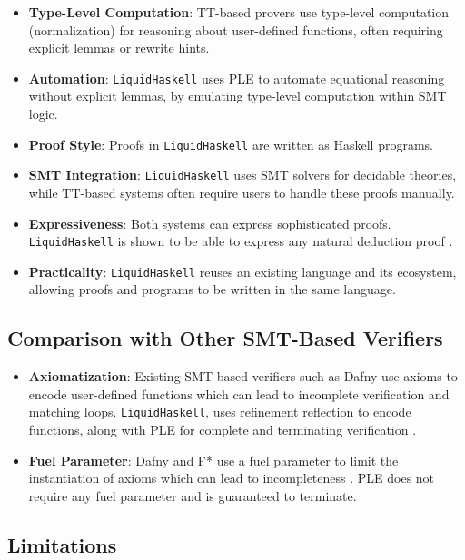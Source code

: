 \documentclass[]{rptuseminar}
\begin{document}
\begin{itemize}
    \item \textbf{Type-Level Computation}: TT-based provers use type-level computation (normalization) 
      for reasoning about user-defined functions, often requiring explicit lemmas or rewrite hints.
    \item \textbf{Automation}: \texttt{LiquidHaskell} uses PLE to automate equational reasoning 
      without explicit lemmas, by emulating type-level computation within SMT logic. 
     \item  \textbf{Proof Style}: Proofs in \texttt{LiquidHaskell} are written as Haskell programs.
    \item  \textbf{SMT Integration}: \texttt{LiquidHaskell} uses SMT solvers for decidable theories, 
        while TT-based systems often require users to handle these proofs manually.
    \item \textbf{Expressiveness}: Both systems can express sophisticated proofs. \texttt{LiquidHaskell} is shown 
      to be able to express any natural deduction proof \cite{vazou_refinement_2018}.
   \item \textbf{Practicality}: \texttt{LiquidHaskell} reuses an existing language and its ecosystem, 
     allowing proofs and programs to be written in the same language. 
\end{itemize}

\subsection*{Comparison with Other SMT-Based Verifiers}
\begin{itemize}
    \item \textbf{Axiomatization}: Existing SMT-based verifiers such as Dafny use axioms to encode user-defined functions 
        which can lead to incomplete verification and matching loops. \texttt{LiquidHaskell}, uses refinement 
        reflection to encode functions, along with PLE for complete and terminating verification \cite{vazou_refinement_2018}.
    \item \textbf{Fuel Parameter}: Dafny and F* use a fuel parameter to limit the instantiation of axioms which can lead 
      to incompleteness \cite{vazou_refinement_2018}. PLE does not require any fuel parameter and is guaranteed to terminate.
\end{itemize}

\subsection*{Limitations}
\end{document}
